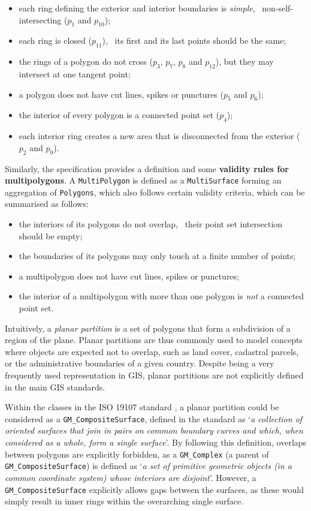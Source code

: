 \begin{itemize}
\item each ring defining the exterior and interior boundaries is \emph{simple}, \ie\ non-self-intersecting ($p_{1}$ and $p_{10}$);
\item each ring is closed ($p_{11}$), \ie\ its first and its last points should be the same;
\item the rings of a polygon do not cross ($p_{3}$, $p_{7}$, $p_{8}$ and $p_{12}$), but they may intersect at one tangent point;
\item a polygon does not have cut lines, spikes or punctures ($p_{5}$ and $p_{6}$);
\item the interior of every polygon is a connected point set ($p_{4}$);
\item each interior ring creates a new area that is disconnected from the exterior ($p_{2}$ and $p_{9}$).
\end{itemize}

Similarly, the specification provides a definition and some \textbf{validity rules for multipolygons}.
A \texttt{MultiPolygon} is defined as a \texttt{MultiSurface} forming an aggregation of \texttt{Polygons}, which also follows certain validity criteria, which can be summarised as follows:

\begin{itemize}
\item the interiors of its polygons do not overlap, \ie\ their point set intersection should be empty;
\item the boundaries of its polygons may only touch at a finite number of points;
\item a multipolygon does not have cut lines, spikes or punctures;
\item the interior of a multipolygon with more than one polygon is \emph{not} a connected point set.
\end{itemize}

Intuitively, a \emph{planar partition} is a set of polygons that form a subdivision of a region of the plane.
Planar partitions are thus commonly used to model concepts where objects are expected not to overlap, such as land cover, cadastral parcels, or the administrative boundaries of a given country.
Despite being a very frequently used representation in GIS, planar partitions are not explicitly defined in the main GIS standards.

Within the classes in the ISO 19107 standard \citep[\S{}6.6]{ISO19107:2005}, a planar partition could be considered as a \texttt{GM\_CompositeSurface}, defined in the standard as `\emph{a collection of oriented surfaces that join in pairs on common boundary curves and which, when considered as a whole, form a single surface}'.
By following this definition, overlaps between polygons are explicitly forbidden, as a \texttt{GM\_Complex} (a parent of \texttt{GM\_CompositeSurface}) is defined as `\emph{a set of primitive geometric objects (in a common coordinate system) whose interiors are disjoint}'.
However, a \texttt{GM\_CompositeSurface} explicitly allows gaps between the surfaces, as these would simply result in inner rings within the overarching single surface.

